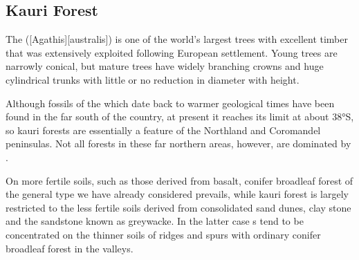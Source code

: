 \subsection{Kauri Forest}

The  ([Agathis][australis]) is one of the world's largest trees with excellent timber that was extensively exploited following European settlement.
Young trees are narrowly conical, but mature trees have widely branching crowns and huge cylindrical trunks with little or no reduction in diameter with height.

Although fossils of the  which date back to warmer geological times have been found in the far south of the country, at present it reaches its limit at about \ang{38}S, so kauri forests are essentially a feature of the Northland and Coromandel peninsulas.
Not all forests in these far northern areas, however, are dominated by .

On more fertile soils, such as those derived from basalt, conifer broadleaf forest of the general type we have already considered prevails, while kauri forest is largely restricted to the less fertile soils derived from consolidated sand dunes, clay stone and the sandstone known as greywacke.
In the latter case s tend to be concentrated on the thinner soils of ridges and spurs with ordinary conifer broadleaf forest in the valleys.

